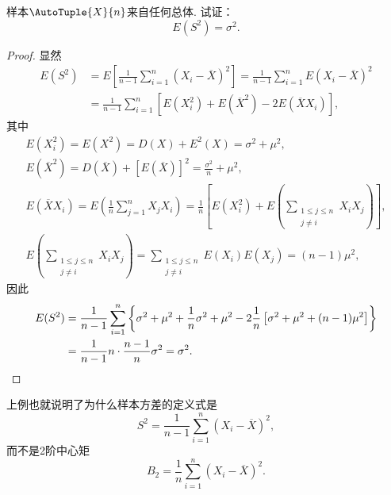 
\begin{example}
样本\(\AutoTuple{X}{n}\)来自任何总体.
试证：\begin{equation}
	E(S^2) = \sigma^2.
\end{equation}
\begin{proof}
显然\begin{align*}
	E(S^2)
	&= E\left[\frac{1}{n-1} \sum_{i=1}^n (X_i-\overline{X})^2\right]
	= \frac{1}{n-1} \sum_{i=1}^n E(X_i-\overline{X})^2 \\
	&= \frac{1}{n-1} \sum_{i=1}^n \left[ E(X_i^2) + E(\overline{X}^2) - 2 E(\overline{X} X_i) \right],
\end{align*}
其中\begin{gather*}
	E(X_i^2) = E(X^2) = D(X) + E^2(X) = \sigma^2 + \mu^2, \\
	E(\overline{X}^2)
	= D(\overline{X}) + [E(\overline{X})]^2
	= \frac{\sigma^2}{n} + \mu^2, \\
	E(\overline{X} X_i)
	= E\left(\frac1n \sum_{j=1}^n X_j X_i\right)
	= \frac1n \left[ E(X_i^2) + E\left(\sum_{\substack{1 \leq j \leq n \\ j \neq i}} X_i X_j\right) \right], \\
	E\left(\sum_{\substack{1 \leq j \leq n \\ j \neq i}} X_i X_j\right)
	= \sum_{\substack{1 \leq j \leq n \\ j \neq i}} E(X_i) E(X_j)
	= (n-1) \mu^2,
\end{gather*}
因此\begin{align*}
	E(S^2) &= \frac{1}{n-1} \sum_{i=1}^n \left\{
			\sigma^2 + \mu^2
			+ \frac1n \sigma^2 + \mu^2
			- 2 \frac1n \left[ \sigma^2 + \mu^2 + (n-1)\mu^2 \right]
		\right\} \\
	&= \frac{1}{n-1} n \cdot \frac{n-1}{n} \sigma^2
	= \sigma^2.
	\qedhere
\end{align*}
\end{proof}
\end{example}
上例也就说明了为什么样本方差的定义式是\[
	S^2 = \frac{1}{n-1} \sum_{i=1}^n (X_i-\overline{X})^2,
\]
而不是2阶中心矩\[
	B_2 = \frac1n \sum_{i=1}^n (X_i-\overline{X})^2.
\]

